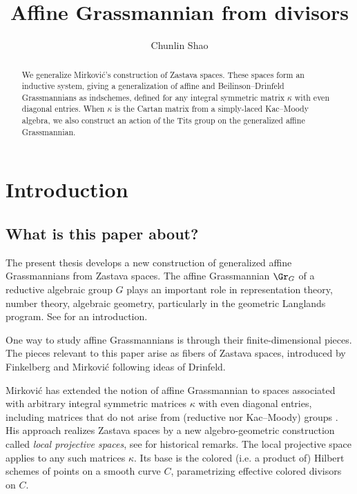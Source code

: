 \documentclass{amsart}
\numberwithin{equation}{section}
\numberwithin{figure}{section}
\theoremstyle{definition}
\theoremstyle{remark}
\begin{document}
	
	\title{\bf Affine Grassmannian from divisors}
\author[Chunlin Shao]{Chunlin Shao}
\address{University of Massachusetts, Amherst, MA, USA.}
	\maketitle
\begin{abstract}
We generalize Mirkovi\'c's construction of Zastava spaces. These spaces form an inductive system, giving a generalization of affine and Beilinson--Drinfeld Grassmannians as indschemes, defined for any integral symmetric matrix $\kappa$ with even diagonal entries. When $\kappa$ is the  Cartan matrix from a simply-laced Kac--Moody algebra, we also construct an action of the Tits group on the generalized affine Grassmannian.
	\end{abstract}
	\vspace{1ex}	
	\vspace{1ex}

\section{Introduction}
\subsection{What is this paper about?}
The present thesis develops a new construction of generalized affine
Grassmannians from Zastava spaces.
The affine Grassmannian $\Gr_G$ of a reductive algebraic group $G$
plays an important role in representation theory, number theory,
algebraic geometry, particularly in the
geometric Langlands program.
See \cite{zhu2016introduction} for an introduction.

One way to study affine Grassmannians is through their finite-dimensional
pieces. The pieces relevant to this paper arise as fibers of Zastava spaces, introduced by Finkelberg and Mirkovi\'c \cite{finkelberg1999semi} following ideas of Drinfeld.

Mirkovi\'c has extended the notion of affine Grassmannian to spaces associated with arbitrary integral
symmetric matrices $\kappa$ with even diagonal entries, including
matrices that do not arise from (reductive nor Kac--Moody) groups
\cite{mirkovic2021loop,mirkovic2023lattice}.
His approach realizes Zastava spaces by a new algebro-geometric construction called \textit{local projective spaces}, see \cite{mirkovic2014loop} for historical remarks.
The local projective space applies to any such matrices $\kappa$. Its base is the colored (i.e. a product of) Hilbert schemes of points on a smooth curve $C$, parametrizing effective colored divisors on $C$.
\end{document}
